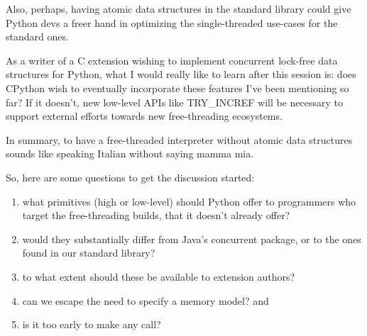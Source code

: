 Also, perhaps, having atomic data structures in the standard library could give Python devs a freer hand in optimizing the single-threaded use-cases for the standard ones.

As a writer of a C extension wishing to implement concurrent lock-free data structures for Python, what I would really like to learn after this session is: does CPython wish to eventually incorporate these features I've been mentioning so far?
If it doesn't, new low-level APIs like TRY\_INCREF will be necessary to support external efforts towards new free-threading ecosystems.

In summary, to have a free-threaded interpreter without atomic data structures sounds like speaking Italian without saying mamma mia.

So,  here are some questions to get the discussion started:
\begin{enumerate}
    \item what primitives (high or low-level) should Python offer to programmers who target the free-threading builds, that it doesn't already offer?
    \item would they substantially differ from Java's concurrent package, or to the ones found in our standard library?
    \item to what extent should these be available to extension authors?
    \item can we escape the need to specify a memory model? and
    \item is it too early to make any call?
\end{enumerate}
